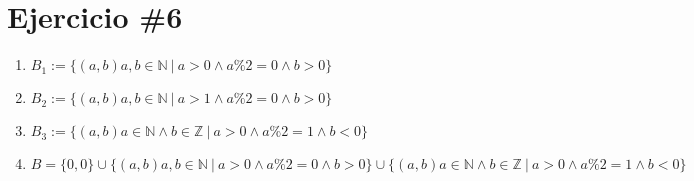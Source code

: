 \documentclass{article}
\begin{document}
\section*{Ejercicio \#6}
\begin{enumerate}

        \item{$ B_1:= \{ (a,b) a,b \in \mathbb{N} \ |\ a > 0 \wedge a\% 2= 0\wedge b > 0 \}$}
        
        \item{$ B_2:= \{ (a,b) a,b \in \mathbb{N} \ |\ a > 1 \wedge a\% 2= 0 \wedge b > 0 \}$}
        \item{$ B_3:= \{ (a,b) a \in \mathbb{N} \wedge b \in \mathbb{Z}\ |\ a > 0 \wedge a\% 2= 1 \wedge b < 0 \}$}
        \item{$ B= \{0,0\} \cup \{ (a,b) a,b \in \mathbb{N} \ |\ a > 0 \wedge a\% 2= 0 \wedge b > 0 \} \cup \{ (a,b) a \in \mathbb{N} \wedge b \in \mathbb{Z}\ |\ a > 0 \wedge a\% 2= 1 \wedge b < 0 \}$}
        \end{enumerate}
\end{document}
